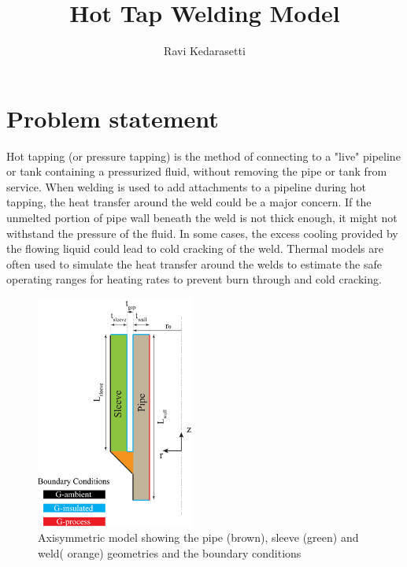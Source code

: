 \documentclass{article}
\title{Hot Tap Welding Model}
\author{Ravi Kedarasetti}
\date{}
\makeatletter
\newcommand{\autocitel}[1]{\autocite{#1}\checknextarg}
\newcommand{\checknextarg}{\@ifnextchar\bgroup{\gobblenextarg}{}}
\newcommand{\gobblenextarg}[1]{$^,$\autocite{#1}\@ifnextchar\bgroup{\gobblenextarg}{}}
\makeatother
\begin{document}
\maketitle

\section{Problem statement}

Hot tapping \autocitel{twi} (or pressure tapping) is the method of connecting to a "live" pipeline or tank containing a pressurized fluid, without removing the pipe or tank from service. When welding is used to add attachments to a pipeline during hot tapping, the heat transfer around the weld could be a major concern. If the unmelted portion of pipe wall beneath the weld is not thick enough, it might not withstand the pressure of the fluid. In some cases, the excess cooling provided by the flowing liquid could lead to cold cracking of the weld. Thermal models are often used to simulate the heat transfer around the welds to estimate the safe operating ranges for heating rates to prevent burn through and cold cracking\autocitel{bruce2006comparison}.\\  

\begin{figure}
	\centering
	\includegraphics[width=0.46\textwidth]{problem_statement.png}
	\caption{Axisymmetric model showing the pipe (brown), sleeve (green) and weld( orange) geometries and the boundary conditions}
	\label{fig1}
\end{figure}
\end{document}
